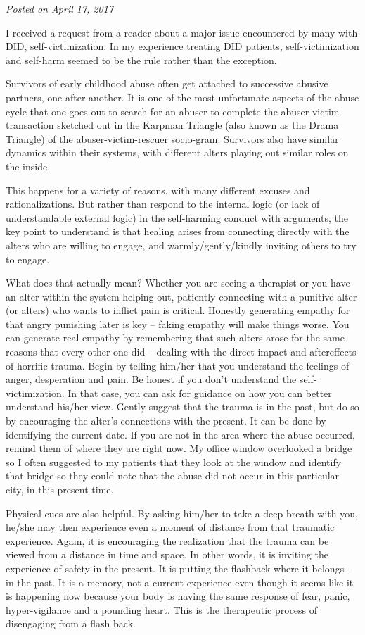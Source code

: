 \documentclass[]{book}
\begin{document}
\emph{Posted on April 17, 2017}

I received a request from a reader about a major issue encountered by many with DID, self-victimization. In my experience treating DID patients, self-victimization and self-harm seemed to be the rule rather than the exception.

Survivors of early childhood abuse often get attached to successive abusive partners, one after another. It is one of the most unfortunate aspects of the abuse cycle that one goes out to search for an abuser to complete the abuser-victim transaction sketched out in the Karpman Triangle (also known as the Drama Triangle) of the abuser-victim-rescuer socio-gram. Survivors also have similar dynamics within their systems, with different alters playing out similar roles on the inside.

This happens for a variety of reasons, with many different excuses and rationalizations. But rather than respond to the internal logic (or lack of understandable external logic) in the self-harming conduct with arguments, the key point to understand is that healing arises from connecting directly with the alters who are willing to engage, and warmly/gently/kindly inviting others to try to engage.

What does that actually mean? Whether you are seeing a therapist or you have an alter within the system helping out, patiently connecting with a punitive alter (or alters) who wants to inflict pain is critical. Honestly generating empathy for that angry punishing later is key -- faking empathy will make things worse. You can generate real empathy by remembering that such alters arose for the same reasons that every other one did -- dealing with the direct impact and aftereffects of horrific trauma.
Begin by telling him/her that you understand the feelings of anger, desperation and pain. Be honest if you don't understand the self-victimization. In that case, you can ask for guidance on how you can better understand his/her view. Gently suggest that the trauma is in the past, but do so by encouraging the alter's connections with the present. It can be done by identifying the current date. If you are not in the area where the abuse occurred, remind them of where they are right now. My office window overlooked a bridge so I often suggested to my patients that they look at the window and identify that bridge so they could note that the abuse did not occur in this particular city, in this present time.

Physical cues are also helpful. By asking him/her to take a deep breath with you, he/she may then experience even a moment of distance from that traumatic experience. Again, it is encouraging the realization that the trauma can be viewed from a distance in time and space. In other words, it is inviting the experience of safety in the present. It is putting the flashback where it belongs -- in the past. It is a memory, not a current experience even though it seems like it is happening now because your body is having the same response of fear, panic, hyper-vigilance and a pounding heart. This is the therapeutic process of disengaging from a flash back.
\end{document}
